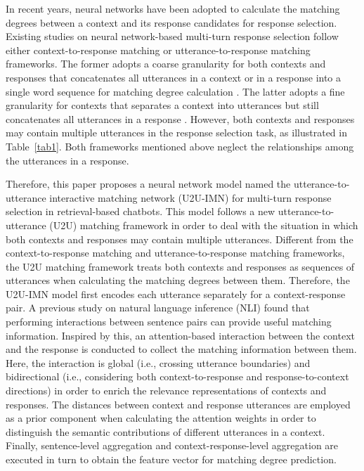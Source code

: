 \documentclass[journal]{IEEEtran}
\begin{document}
  In recent years, neural networks have been adopted to calculate the matching degrees between a context and its response candidates for response selection.
  Existing studies on neural network-based multi-turn response selection follow either context-to-response matching or utterance-to-response matching frameworks.
  The former adopts a coarse granularity for both contexts and responses that concatenates all utterances in a context or in a response into a single word sequence for matching degree calculation \cite{DBLP:conf/sigdial/LowePSP15,DBLP:journals/corr/KadlecSK15,DBLP:journals/dad/LowePSCLP17}.
  The latter adopts a fine granularity for contexts that separates a context into utterances but still concatenates all utterances in a response \cite{DBLP:conf/acl/WuWXZL17,DBLP:conf/acl/WuLCZDYZL18,DBLP:conf/coling/ZhangLZZL18}.
  However, both contexts and responses may contain multiple utterances in the response selection task, as illustrated in Table~\ref{tab1}.
  Both frameworks mentioned above neglect the relationships among the utterances in a response.

  Therefore, this paper proposes a neural network model named the utterance-to-utterance interactive matching network (U2U-IMN) for multi-turn response selection in retrieval-based chatbots.
  This model follows a new utterance-to-utterance (U2U) matching framework in order to deal with the situation in which both contexts and responses may contain multiple utterances.
  Different from the context-to-response matching and utterance-to-response matching frameworks, the U2U matching framework treats both contexts and responses as sequences of utterances when calculating the matching degrees between them.
  Therefore, the U2U-IMN model first encodes each utterance separately for a context-response pair.
  A previous study on natural language inference (NLI) \cite{DBLP:conf/acl/ChenZLWJI17} found that performing interactions between sentence pairs can provide useful matching information.
  Inspired by this, an attention-based interaction between the context and the response is conducted to collect the matching information between them.
  Here, the interaction is global (i.e., crossing utterance boundaries) and bidirectional (i.e., considering both context-to-response and response-to-context directions) in order to enrich the relevance representations of contexts and responses.
  The distances between context and response utterances are employed as a prior component when calculating the attention weights in order to distinguish the semantic contributions of different utterances in a context.
  Finally, sentence-level aggregation and context-response-level aggregation are executed in turn to obtain the feature vector for matching degree prediction.
\end{document}
